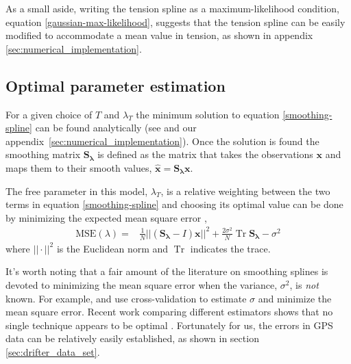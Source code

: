 \documentclass[10pt,journal]{IEEEtran}
\DeclareMathOperator{\Tr}{Tr}
\begin{document}
As a small aside, writing the tension spline as a maximum-likelihood condition, equation \ref{gaussian-max-likelihood}, suggests that the tension spline can be easily modified to accommodate a mean value in tension, as shown in appendix \ref{sec:numerical_implementation}. 

\subsection{Optimal parameter estimation} \label{sec:optimal_parameter}

For a given choice of $T$ and $\lambda_T$ the minimum solution to equation \ref{smoothing-spline} can be found analytically (see \cite{teanby2007-mg} and our appendix~\ref{sec:numerical_implementation}). Once the solution is found the smoothing matrix $\mathbf{S_\lambda}$ is defined as the matrix that takes the observations $\mathbf{x}$ and maps them to their smooth values, $\mathbf{\hat{x}} = \mathbf{S_\lambda} \mathbf{x}$.

The free parameter in this model, $\lambda_T$, is a relative weighting between the two terms in equation \ref{smoothing-spline} and choosing its optimal value can be done by minimizing the expected mean square error \cite{craven1979-nm},
\begin{align}
\label{MSE}
    \textrm{MSE}(\lambda) =& \frac{1}{N} || \left( \mathbf{S_\lambda} - I \right) \mathbf{x} ||^2 + \frac{2 \sigma^2}{N}  \Tr \mathbf{S_\lambda} - \sigma^2
\end{align}
where $||\cdot||^2$ is the Euclidean norm and $\Tr$ indicates the trace.

It's worth noting that a fair amount of the literature on smoothing splines is devoted to minimizing the mean square error when the variance, $\sigma^2$, is \emph{not} known. For example, \cite{wahba1978-jrss-b} and \cite{craven1979-nm} use cross-validation to estimate $\sigma$ and minimize the mean square error. Recent work comparing different estimators shows that no single technique appears to be optimal \cite{lee2003-csda}. Fortunately for us, the errors in GPS data can be relatively easily established, as shown in section \ref{sec:drifter_data_set}.
\end{document}
